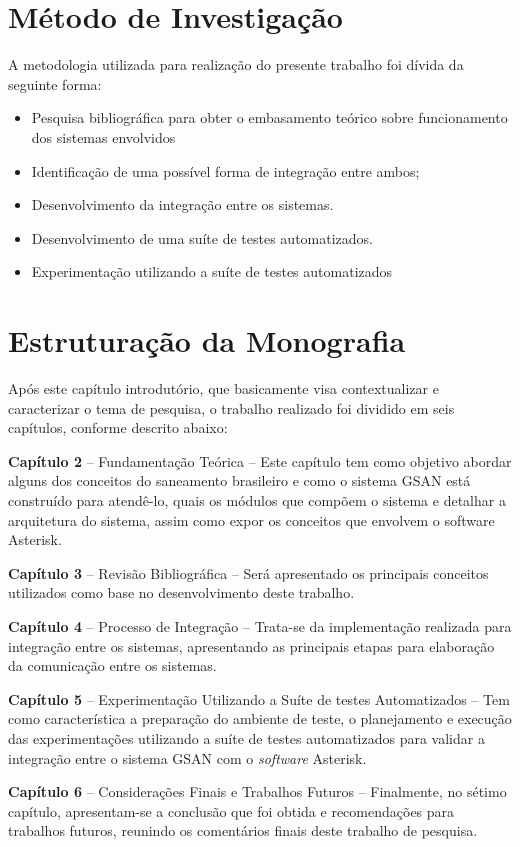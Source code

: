 \section*{Método de Investigação}
A metodologia utilizada para realização do presente trabalho foi dívida da seguinte forma:
\begin{itemize}
	\item Pesquisa bibliográfica para obter o embasamento teórico sobre funcionamento dos sistemas envolvidos
	\item Identificação de uma possível forma de integração entre ambos;
	\item Desenvolvimento da integração entre os sistemas.
	\item Desenvolvimento de uma suíte de testes automatizados.
	\item Experimentação utilizando a suíte de testes automatizados
\end{itemize}

\section*{Estruturação da Monografia}
	
Após este capítulo introdutório, que basicamente visa contextualizar e caracterizar o tema de pesquisa, o trabalho realizado foi dividido em seis capítulos, conforme descrito abaixo:
\begin{description}
	\item \textbf{Capítulo 2} – Fundamentação Teórica – Este capítulo tem como objetivo abordar alguns dos conceitos do saneamento brasileiro e como o sistema GSAN está construído para atendê-lo, quais os módulos que compõem o sistema e detalhar a arquitetura do sistema, assim como expor os conceitos que envolvem o software Asterisk.
	\item \textbf{Capítulo 3 } – Revisão Bibliográfica – Será apresentado os principais conceitos utilizados como base no desenvolvimento deste trabalho.
	\item \textbf{Capítulo  4} – Processo de Integração – Trata-se da implementação realizada para integração entre os sistemas, apresentando as principais etapas para elaboração da comunicação entre os sistemas.
	\item \textbf{Capítulo  5} – Experimentação Utilizando a Suíte de testes Automatizados – Tem como característica a preparação do ambiente de teste, o planejamento e execução das experimentações utilizando a suíte de testes automatizados para validar a integração entre o sistema GSAN com o \textit{software} Asterisk.
	\item \textbf{Capítulo 6} – Considerações Finais e Trabalhos Futuros – Finalmente, no sétimo capítulo, apresentam-se a conclusão que foi obtida e recomendações para trabalhos futuros, reunindo os comentários finais deste trabalho de pesquisa.	
\end{description}
	

